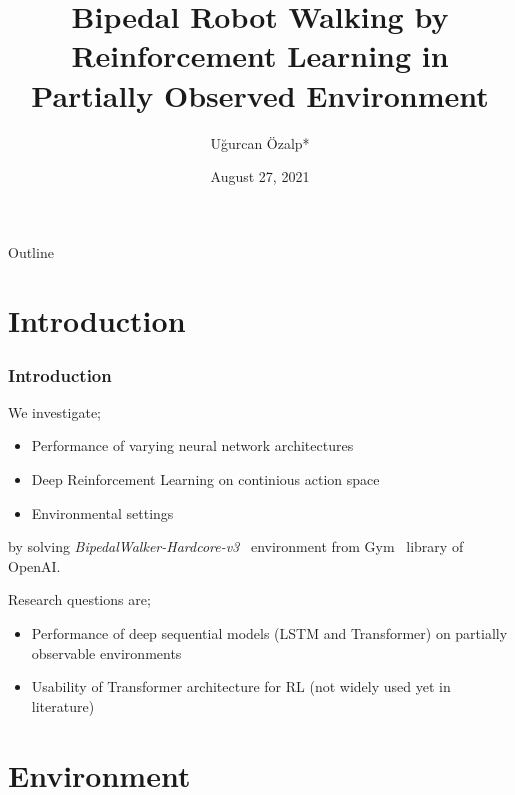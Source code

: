 \documentclass{beamer}
\title[Robot Walking by RL]{Bipedal Robot Walking by Reinforcement Learning in Partially Observed Environment}
\author[U. Özalp]{Uğurcan Özalp*\inst{1}}
\institute[METU] %
{
	\inst{1}
	Scientific Computing
	
	Institute of Applied Mathematics\\
  Middle East Technical University\\
	
 	}
\date[MSc Thesis Defense]{August 27, 2021}
\begin{document}
\begin{frame}
  \titlepage
\end{frame}

\begin{frame}{Outline}
  \tableofcontents
\end{frame}


\section{Introduction}

\begin{frame}
\frametitle{Introduction}
We investigate;
\begin{itemize}
	\item Performance of varying neural network architectures
	\item Deep Reinforcement Learning on continious action space
	\item Environmental settings
\end{itemize}
by solving \textit{BipedalWalker-Hardcore-v3}~ \cite{noauthor_bipedalwalkerhardcore-v2_2021} environment from Gym~\cite{brockman_openai_2016} library of OpenAI.

Research questions are;
\begin{itemize}
	\item Performance of deep sequential models (LSTM and Transformer) on partially observable environments 
	\item Usability of Transformer architecture for RL (not widely used yet in literature)	
\end{itemize}
\end{frame}


\section{Environment}
\end{document}

